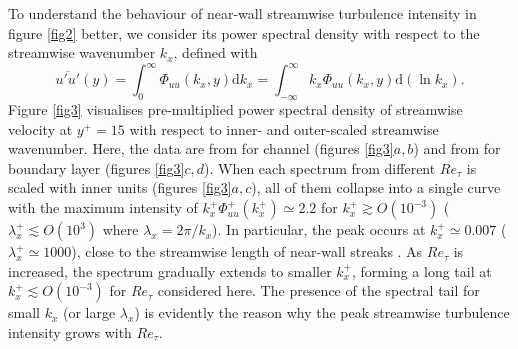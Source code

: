 \documentclass{jfm}
\begin{document}
To understand the behaviour of near-wall streamwise turbulence intensity in figure \ref{fig2} better, we consider its power spectral density with respect to the streamwise wavenumber $k_x$, defined with
\begin{equation}\label{eq:2.1}
\overline{u'u'}(y)=\int_0^\infty \Phi_{uu}(k_x,y) \mathrm{d}k_x=\int_{-\infty}^{\infty} k_x \Phi_{uu}(k_x,y) \mathrm{d}(\ln k_x).
\end{equation}
Figure \ref{fig3} visualises pre-multiplied power spectral density of streamwise velocity at $y^+=15$ with respect to inner- and outer-scaled streamwise wavenumber. Here, the data are from \cite{Lee2015} for channel (figures \ref{fig3}$a,b$) and from \cite{Samie2018} for boundary layer (figures \ref{fig3}$c,d$). When each spectrum from different $Re_\tau$ is scaled with inner units (figures \ref{fig3}$a,c$), all of them collapse into a single curve with the maximum intensity of $k_x^+ \Phi_{uu}^+(k_x^+)\simeq 2.2$ for $k_x^+ \gtrsim O(10^{-3})$ ($\lambda_x^+ \lesssim O(10^{3})$ where $\lambda_x=2\pi/k_x$). In particular, the peak occurs at $k_x^+ \simeq 0.007$ ($\lambda_x^+ \simeq 1000$), close to the streamwise length of near-wall streaks \cite[]{Hwang2013}. As $Re_\tau$ is increased, the spectrum gradually extends to smaller $k_x^+$, forming a long tail at $k_x^+ \lesssim O(10^{-3})$ for $Re_\tau$ considered here. The presence of the spectral tail for small $k_x$ (or large $\lambda_x$) is evidently the reason why the peak streamwise turbulence intensity grows with $Re_\tau$.
\end{document}
